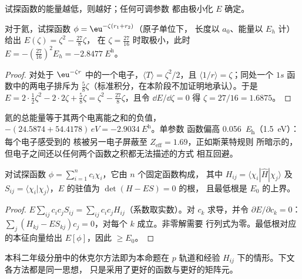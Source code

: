 试探函数的能量越低，则越好；任何可调参数
都由极小化 $E$ 确定。

\begin{proposition}[屏蔽电荷的氦]\label{prop:b3:computational-chemistry:helium-zeta}
对于氦，试探函数 $\phi = \eu^{-\zeta(r_1 + r_2)}$（原子单位下，
长度以 $a_0$、能量以 $E_h$ 计）给出 $E(\zeta) = \zeta^2 - \frac{27}{8}\zeta$，
在 $\zeta = \frac{27}{16}$ 时取极小，此时 $E = -(\frac{27}{16})^2 E_h =
\qty{-2.8477}{\hartree}$。
\end{proposition}

\begin{proof}
对处于 $\eu^{-\zeta r}$ 中的一个电子，$\langle T\rangle = \zeta^2/2$，且
$\langle 1/r\rangle = \zeta$；同处一个 $1s$
函数中的两电子排斥为 $\frac58\zeta$（标准积分，在本阶段不加证明地承认）。于是 $E = 2\cdot\frac12
\zeta^2 - 2\cdot2\zeta + \frac58\zeta = \zeta^2 - \frac{27}{8}\zeta$，且令 $\dd E/\dd
\zeta = 0$ 得 $\zeta = 27/16 = 1.6875$。
\end{proof}

\begin{example}[效果如何？]\label{ex:b3:computational-chemistry:helium}
氦的总能量等于其两个电离能之和的负值，
$-(24.5874 + 54.4178)\,\unit{eV} = \qty{-2.9034}{\hartree}$。单参数
函数偏高 \qty{0.056}{\hartree}（\qty{1.5}{eV}）：每个电子感受到的
核被另一电子屏蔽至 $Z_{\mathrm{eff}} = 1.69$，正如斯莱特规则
所暗示的，但电子之间还以任何两个函数之积都无法描述的方式
相互回避。
\end{example}

\begin{proposition}[线性变分]\label{prop:b3:computational-chemistry:linear-variation}
对试探函数 $\phi = \sum_{i=1}^n c_i\chi_i$，它由 $n$ 个固定函数构成，
其中 $H_{ij} = \langle\chi_i|\hat H|\chi_j\rangle$ 及 $S_{ij} = \langle\chi_i|\chi_j
\rangle$，$E$ 的驻值为 $\det(H - ES) = 0$ 的根，
且最低根是 $E_0$ 的上界。
\end{proposition}

\begin{proof}
$E\sum_{ij}c_ic_jS_{ij} = \sum_{ij}c_ic_jH_{ij}$（系数取实数）。对
$c_k$ 求导，并令 $\partial E/\partial c_k = 0$：$\sum_j(H_{kj} -
ES_{kj})c_j = 0$，对每个 $k$ 成立。非零解需要
行列式为零。最低根对应的本征向量给出 $E[\phi]$，因此 $\ge E_0$。
\end{proof}

本科二年级分册中的休克尔方法即为本命题在 $p$
轨道和经验 $H_{ij}$ 下的情形。下文各方法都是同一思想，
只是采用了更好的函数与更好的矩阵元。

